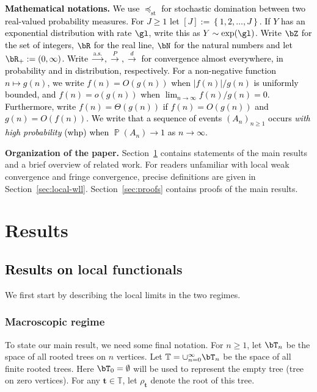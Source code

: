 \documentclass[letterpaper,11pt,reqno]{amsart}
\theoremstyle{definition}
\renewcommand{\geq}{\geqslant}
\newcommand{\set}[1]{\left\{#1\right\}}
\DeclareMathOperator{\pr}{\mathds{P}}
\newcommand{\bbT}{\mathbb{T}}
\newcommand{\bt}{\mathbf{t}}
\newcommand{\convas}{\stackrel{\mathrm{a.s.}}{\longrightarrow}}
\newcommand{\convd}{\stackrel{d}{\longrightarrow}}
\newcommand{\convp}{\stackrel{P}{\longrightarrow}}
\newcommand{\stod}{\preceq_{\mathrm{st}}}
\begin{document}
\medskip 


\noindent\textcolor{black}{\textbf{Mathematical notations.} We use $\stod$ for stochastic domination between two real-valued probability measures. For $J\geq 1$ let $[J]:= \set{1,2,\ldots, J}$. If $Y$ has an exponential distribution with rate $\gl$, write this as $Y\sim \exp(\gl)$. Write $\bZ$ for the set of integers, $\bR$ for the real line, $\bN$ for the natural numbers and let $\bR_+:=(0,\infty)$. Write $\convas,\convp,\convd$ for convergence almost everywhere, in probability and in distribution, respectively. For a non-negative function $n\mapsto g(n)$,
we write $f(n)=O(g(n))$ when $|f(n)|/g(n)$ is uniformly bounded, and
$f(n)=o(g(n))$ when $\lim_{n\rightarrow \infty} f(n)/g(n)=0$.
Furthermore, write $f(n)=\Theta(g(n))$ if $f(n)=O(g(n))$ and $g(n)=O(f(n))$.
We write that a sequence of events $(A_n)_{n\geq 1}$
occurs \emph{with high probability} (whp) when $\pr(A_n)\rightarrow 1$ as $n \rightarrow \infty$.}

\medskip

\noindent\textbf{Organization of the paper.} Section~\ref{sec:main-res} contains statements of the main results and a brief overview of related work. For readers unfamiliar with local weak convergence and fringe convergence, precise definitions are given in Section~\ref{sec:local-wll}. Section~\ref{sec:proofs} contains proofs of the main results. 



\section{Results}
\label{sec:main-res}

\subsection{\textcolor{black}{Results on} local functionals}
We first start by describing the local limits in the two regimes. 
\subsubsection{\bf Macroscopic regime}\label{subsec:results-macro}

To state our main result, we need some final notation. For $n\geq 1$, let $ \bT_{n} $ be the space of all rooted trees on  $n$ {vertices}. Let $ \bbT =
\cup_{n=0}^\infty \bT_{n} $ be the space of all finite rooted trees.  Here $\bT_{0} = \emptyset $ will be used to represent the empty tree (tree on zero vertices). For any $\bt \in \bbT$, let $\rho_{\bt}$ denote the root of this tree.
\end{document}

